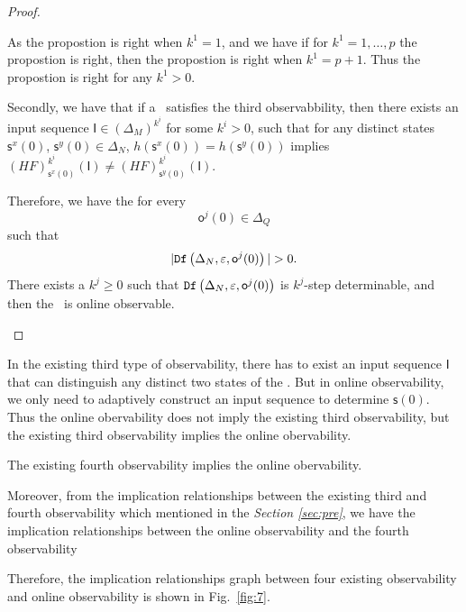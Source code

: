 \begin{proof}
\begin{itemize}
As the propostion is right when $k^1 =1$, and we have if for $k^1=1,\ldots, p$ the propostion is right, then the propostion is right when $k^1=p+1$. Thus the propostion is right for any $k^1>0$.

Secondly, we have that if a \BCN\ satisfies the third observabbility, then there exists an input sequence $\mathsf{I}\in(\Delta_M)^{k^i}$ for some $k^i >0$, such that for any distinct states $\mathsf{s}^{x}(0)$, $\mathsf{s}^{y}(0) \in \Delta_N$, $h(\mathsf{s}^{x}(0))=h(\mathsf{s}^{y}(0))$ implies $(HF)^{k^i}_{\mathsf{s}^{x}(0)}(\mathsf{I})\neq (HF)^{k^i}_{\mathsf{s}^{y}(0)}(\mathsf{I})$. 

Therefore, we have the for every \[\mathsf{o}^{j}(0)\in \Delta_Q\] such that \[|\Ded\left(\Delta_N,\varepsilon, \mathsf{o}^{j}(0)\right)|> 0.\] There exists a $k^{j}\ge0$ such that ${\tt Df}\left(\Delta_N,\varepsilon,\mathsf{o}^{j}(0)\right)$ is $k^{j}$-step determinable, and then the \BCN\ is online observable.
 \end{itemize}
\end{proof}

In the existing third type of observability, there has to exist an input sequence $\mathsf{I}$ that can distinguish any distinct two states of the \BCN. But in online observability, we only need to adaptively construct an input sequence to determine $\mathsf{s}(0)$. Thus the online obervability does not imply the existing third observability, but the existing third observability implies the online obervability. 

\begin{lemma}
The existing fourth observability implies the online obervability.
\label{lemma:5}
\end{lemma}

Moreover, from the implication relationships between the existing third and fourth observability which mentioned in the {\em Section \ref{sec:pre}}, we have the implication relationships between the online observability and the fourth observability

Therefore, the implication relationships graph between four existing observability and online observability is shown in Fig.~\ref{fig:7}.

